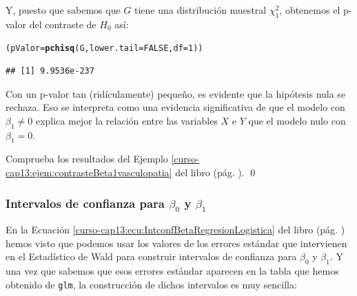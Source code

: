 \documentclass[10pt,a4paper]{article}\usepackage[]{graphicx}\usepackage[]{color}
\makeatletter
\newcommand{\hlnum}[1]{\textcolor[rgb]{0.686,0.059,0.569}{#1}}%
\newcommand{\hlstd}[1]{\textcolor[rgb]{0.345,0.345,0.345}{#1}}%
\newcommand{\hlkwb}[1]{\textcolor[rgb]{0.69,0.353,0.396}{#1}}%
\newcommand{\hlkwc}[1]{\textcolor[rgb]{0.333,0.667,0.333}{#1}}%
\newcommand{\hlkwd}[1]{\textcolor[rgb]{0.737,0.353,0.396}{\textbf{#1}}}%
\newenvironment{kframe}{%
 \def\at@end@of@kframe{}%
 \ifinner\ifhmode%
  \def\at@end@of@kframe{\end{minipage}}%
  \begin{minipage}{\columnwidth}%
 \fi\fi%
 \def\FrameCommand##1{\hskip\@totalleftmargin \hskip-\fboxsep
 \colorbox{shadecolor}{##1}\hskip-\fboxsep
     \hskip-\linewidth \hskip-\@totalleftmargin \hskip\columnwidth}%
 \MakeFramed {\advance\hsize-\width
   \@totalleftmargin\z@ \linewidth\hsize
   \@setminipage}}%
 {\par\unskip\endMakeFramed%
 \at@end@of@kframe}
\newenvironment{knitrout}{}{} %
\newcounter {cont01}
\makeatother
\begin{document}
Y, puesto que sabemos que $G$ tiene una distribución muestral $\chi^2_1$, obtenemos el p-valor del contraste de $H_0$ así:

\begin{knitrout}
\color{fgcolor}\begin{kframe}
\begin{alltt}
\hlstd{(pValor} \hlkwb{=} \hlkwd{pchisq}\hlstd{(G,} \hlkwc{lower.tail} \hlstd{=} \hlnum{FALSE}\hlstd{,} \hlkwc{df}\hlstd{=}\hlnum{1}\hlstd{))}
\end{alltt}
\begin{verbatim}
## [1] 9.9536e-237
\end{verbatim}
\end{kframe}
\end{knitrout}

Con un p-valor tan (ridículamente) pequeño, es evidente que la hipótesis nula se rechaza. Eso se interpreta como una evidencia significativa de que el modelo con $\beta_1\neq 0$ explica mejor la relación entre las variables $X$ e $Y$ que el modelo nulo con $\beta_1 = 0$.

\begin{ejercicio}
\label{tut13:ejercicio07}
Comprueba los resultados del Ejemplo \ref{curso-cap13:ejem:contrasteBeta1vasculopatia} del libro (pág. \pageref{curso-cap13:ejem:contrasteBeta1vasculopatia}).
\qed
\end{ejercicio}



\subsubsection{Intervalos de confianza para $\beta_0$ y $\beta_1$}

En la Ecuación \ref{curso-cap13:ecu:IntconfBetaRegresionLogistica} del libro (pág. \pageref{curso-cap13:ecu:IntconfBetaRegresionLogistica}) hemos visto que podemos usar los valores de los errores estándar que intervienen en el Estadístico de Wald para construir intervalos de confianza para $\beta_0$ y $\beta_1$. Y una vez que sabemos que esos errores estándar aparecen en la tabla que hemos obtenido de {\tt glm}, la construcción de dichos intervalos es muy sencilla:
\end{document}
